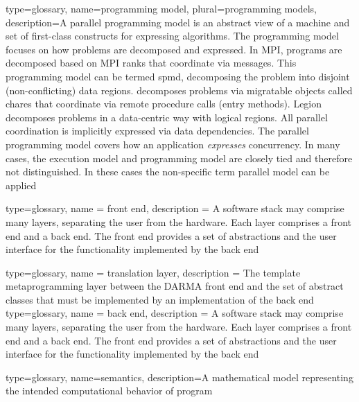 {
  type=glossary,
  name={programming model},
  plural={programming models},
  description={A parallel programming model is an abstract view of a machine
    and set of first-class constructs for expressing algorithms. The programming
      model focuses on how problems are decomposed and expressed.  In
      \gls{MPI}, programs are decomposed based on \gls{MPI} ranks that coordinate via
      messages. This programming model can be termed \gls{spmd}, decomposing
      the problem into disjoint (non-conflicting) data regions.  \Charm{}
    decomposes problems via migratable objects called \glspl{chare} that
      coordinate via remote procedure calls (entry methods). Legion decomposes
      problems in a data-centric way with logical regions.  All parallel
      coordination is implicitly expressed via data dependencies.  The parallel
      programming model covers how an application \emph{expresses}
    \gls{concurrency}.
In many cases, the \gls{execution model} and programming model are closely tied
and therefore not distinguished. In these cases the non-specific term parallel
model can be applied
     }
}

{
  type=glossary,
  name = {front end},
  description = {A software stack may comprise many layers, separating the 
    user from the hardware.  Each layer comprises a front end
      and a \gls{back end}.  The front end provides a set of abstractions and the
      user interface for the functionality implemented by the back end}
}

{
  type=glossary,
  name = {translation layer},
  description = {The \CC \gls{template metaprogramming} layer between the
    DARMA \gls{front end} and the set of abstract classes that must be implemented
    by an implementation of the \gls{back end}}
}
{
  type=glossary,
  name = {back end},
  description = {A software stack may comprise many layers, separating the 
    user from the hardware.  Each layer comprises a \gls{front end}
      and a back end.  The front end provides a set of abstractions and the
      user interface for the functionality implemented by the back end}
}

{
  type=glossary,
    name={semantics},
    description={A mathematical model representing the intended computational behavior of program}
}

